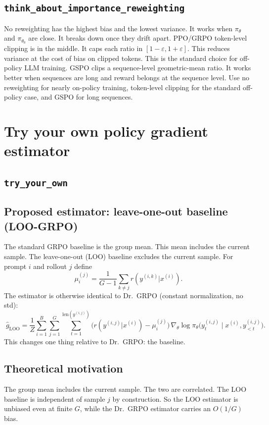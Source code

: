 \documentclass[11pt]{article}
\newcommand{\policy}{\pi_\theta}
\newcommand{\policyold}{\pi_{\theta_0}}
\newcommand{\problemid}[1]{\subsection*{\nolinkurl{#1}}}
\begin{document}
\problemid{think_about_importance_reweighting}

No reweighting has the highest bias and the lowest variance. It works when
$\policy$ and $\policyold$ are close. It breaks down once they drift apart.
PPO/GRPO token-level clipping is in the middle. It caps each ratio in
$[1-\varepsilon, 1+\varepsilon]$. This reduces variance at the cost of bias on
clipped tokens. This is the standard choice for off-policy LLM training. GSPO
clips a sequence-level geometric-mean ratio. It works better when sequences are
long and reward belongs at the sequence level. Use no reweighting for nearly
on-policy training, token-level clipping for the standard off-policy case, and
GSPO for long sequences.

\section{Try your own policy gradient estimator}

\problemid{try_your_own}

\subsection*{Proposed estimator: leave-one-out baseline (LOO-GRPO)}

The standard GRPO baseline is the group mean. This mean includes the current
sample. The leave-one-out (LOO) baseline excludes the current sample. For
prompt $i$ and rollout $j$ define
\[
\mu_i^{(j)} = \frac{1}{G-1}\sum_{k\neq j} r(y^{(i,k)}|x^{(i)}).
\]
The estimator is otherwise identical to Dr.\ GRPO (constant normalization,
no std):
\[
\boxed{\;\hat g_{\text{LOO}} = \frac{1}{Z}\sum_{i=1}^B \sum_{j=1}^G \sum_{t=1}^{\text{len}(y^{(i,j)})}\bigl(r(y^{(i,j)}|x^{(i)}) - \mu_i^{(j)}\bigr)\,\nabla_\theta\log\policy\bigl(y_t^{(i,j)}\mid x^{(i)}, y_{<t}^{(i,j)}\bigr).\;}
\]
This changes one thing relative to Dr.\ GRPO: the baseline.

\subsection*{Theoretical motivation}

The group mean includes the current sample. The two are correlated. The LOO
baseline is independent of sample $j$ by construction. So the LOO estimator is
unbiased even at finite $G$, while the Dr.\ GRPO estimator carries an
$O(1/G)$ bias.
\end{document}
